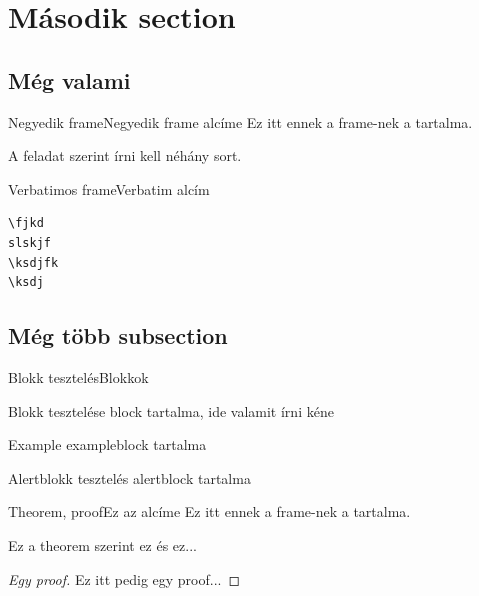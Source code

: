 \documentclass[aspectratio=169, bigger, xcolor={table}]{beamer}
\begin{document}
\section{Második section}
\subsection{Még valami}
\begin{frame}{Negyedik frame}{Negyedik frame alcíme}
Ez itt ennek a frame-nek a tartalma.

A feladat szerint írni kell néhány sort.
\end{frame}

\begin{frame}[fragile]{Verbatimos frame}{Verbatim alcím}

\begin{verbatim}
\fjkd
slskjf
\ksdjfk
\ksdj
\end{verbatim}

\end{frame}

\subsection{Még több subsection}
\begin{frame}{Blokk tesztelés}{Blokkok}
\begin{block}{Blokk tesztelése}
block tartalma, ide valamit írni kéne
\end{block}

\pause
\begin{exampleblock}{Example}
exampleblock tartalma
\end{exampleblock}

\pause
\begin{alertblock}{Alertblokk tesztelés}
alertblock tartalma
\end{alertblock}

\end{frame}

\begin{frame}{Theorem, proof}{Ez az alcíme}
Ez itt ennek a frame-nek a tartalma.
\begin{theorem}
Ez a theorem szerint ez és ez...
\end{theorem}

\pause
\begin{proof}[Egy proof]
Ez itt pedig egy proof...
\end{proof}
\end{frame}
\end{document}
